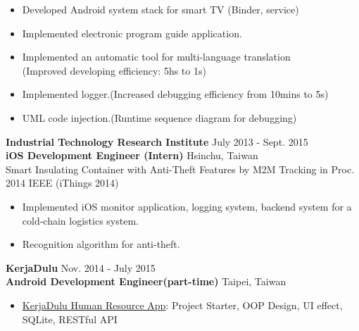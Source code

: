 \documentclass{res}
\begin{document}
\begin{resume}
				\begin{itemize}[leftmargin=*]
					\item Developed Android system stack for smart TV (Binder, service)	
					\vspace{-0.05in}
					\item Implemented electronic program guide application.
					\vspace{-0.05in}
					\item Implemented an automatic tool for multi-language translation \\(Improved developing efficiency: 5hs to 1s)
					\vspace{-0.05in}		
					\item Implemented logger.(Increased debugging efficiency from 10mins to 5s)
					\vspace{-0.05in}	
					\item UML code injection.(Runtime sequence diagram for debugging)
				\end{itemize}
				\vspace{-0.12in}
				{\bf Industrial Technology Research Institute } {\hfill July 2013 - Sept. 2015}\\	
				{\bf iOS Development Engineer (Intern)}                        {\hfill Hsinchu, Taiwan}\\
				Smart Insulating Container with Anti-Theft Features by M2M Tracking {\footnotesize in Proc. 2014 IEEE (iThings 2014)}
				\vspace{0.05in}
				\begin{itemize}[leftmargin=*]


					\item Implemented iOS monitor application, logging system, backend system for a cold-chain logistics system.
					\vspace{-0.05in} 
					\item Recognition algorithm for anti-theft.
				\end{itemize}
				\vspace{-0.12in}

	 			{\bf KerjaDulu }                                {\hfill  Nov. 2014 - July 2015}\\
				{\bf Android Development Engineer(part-time)}			    	 {\hfill Taipei, Taiwan}
		
				\begin{itemize}[leftmargin=*]
					\item {\href{https://play.google.com/store/apps/details?id=com.kerjadulu.kerjadulu&hl=zh_TW}{KerjaDulu Human Resource App}}: Project Starter, OOP Design, UI effect, SQLite, RESTful API
				\end{itemize}
				\vspace{-0.12in}


\end{resume}
\end{document}
